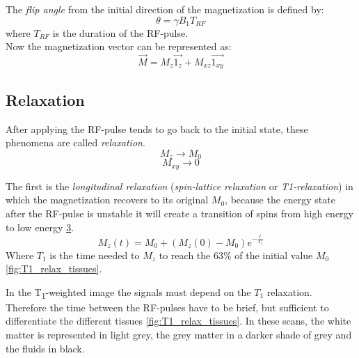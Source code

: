  \begin{figure}[h]
    \centering
    \caption{}
    \label{fig:trajectory_magnetization}
 \end{figure}

 \begin{figure}[h]
    \centering
    \caption{}
    \label{fig:energy_gaining}
 \end{figure}

 \noindent The \emph{flip angle} from the initial direction of the magnetization is defined by:
 \[\theta = \gamma B_{1}T_{RF}\]
 where $T_{RF}$ is the duration of the RF-pulse.\\
 Now the magnetization vector can be represented as:
 \begin{equation}
    \vec{M}=M_{z}\vec{1_{z}}+M_{xz}\vec{1_{xy}}
 \end{equation}

 \subsection{Relaxation}
 After applying the RF-pulse tends to go back to the initial state, these phenomena are called \emph{relaxation}. 
 \[M_{z} \rightarrow M_{0}\]
 \[M_{xy} \rightarrow 0 \]

 The first is the \emph{longitudinal relaxation} (\emph{spin-lattice relaxation} or \emph{T1-relaxation}) in which the magnetization recovers to its original $M_0$, because the energy state after the RF-pulse is unstable it will create a transition of spins from high energy to low energy \ref{fig:T1_relax_energy}.
 \begin{equation}
    M_{z}(t)=M_{0}+(M_{z}(0)-M_{0})e^{-\frac{t}{T_{1}}}
 \end{equation}
 Where $T_1$ is the time needed to $M_{z}$ to reach the $63\%$ of the initial value $M_{0}$ \ref{fig:T1_relax_tissues}.

 \begin{figure}[h]
    \centering
    \caption{}
    \label{fig:T1_relax_energy}
 \end{figure}

 In the T\textsubscript{1}-weighted image the signals must depend on the $T_1$ relaxation. Therefore the time between the RF-pulses have to be brief, but sufficient to differentiate the different tissues \ref{fig:T1_relax_tissues}. In these scans, the white matter is represented in light grey, the grey matter in a darker shade of grey and the fluids in black.

